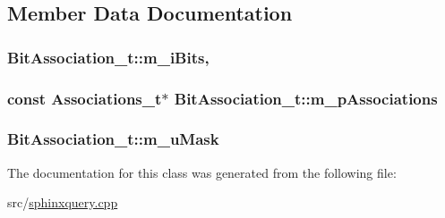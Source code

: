 \subsection{Member Data Documentation}
\hypertarget{classBitAssociation__t_a7cbfc7f44a9fb275dc959433a7741d4b}{
\subsubsection[{m\-\_\-i\-Bits}]{ Bit\-Association\-\_\-t\-::m\-\_\-i\-Bits\hspace{0.3cm}{\ttfamily [mutable]}, {\ttfamily [private]}}}\label{classBitAssociation__t_a7cbfc7f44a9fb275dc959433a7741d4b}
\hypertarget{classBitAssociation__t_a2727f48883d44fb1db6cc58d09175513}{
\subsubsection[{m\-\_\-p\-Associations}]{\setlength{\rightskip}{0pt plus 5cm}const {\bf Associations\-\_\-t}$\ast$ Bit\-Association\-\_\-t\-::m\-\_\-p\-Associations\hspace{0.3cm}{\ttfamily [private]}}}\label{classBitAssociation__t_a2727f48883d44fb1db6cc58d09175513}
\hypertarget{classBitAssociation__t_aad1ae6183b475fe961a3164520b56fc3}{
\subsubsection[{m\-\_\-u\-Mask}]{ Bit\-Association\-\_\-t\-::m\-\_\-u\-Mask}}\label{classBitAssociation__t_aad1ae6183b475fe961a3164520b56fc3}


The documentation for this class was generated from the following file\-:\begin{DoxyCompactItemize}
\item 
src/\hyperlink{sphinxquery_8cpp}{sphinxquery.\-cpp}\end{DoxyCompactItemize}
